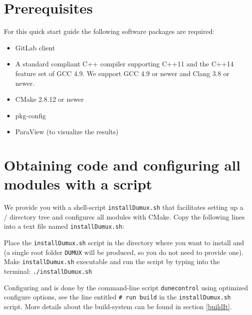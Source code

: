 \section{Prerequisites} \label{sec:prerequisites}
For this quick start guide the following software packages are required:
\begin{itemize}
\item GitLab client
\item A standard compliant C++ compiler supporting C++11 and the C++14 feature set of GCC 4.9. We support GCC 4.9 or newer and Clang 3.8 or newer.
\item CMake 2.8.12 or newer
\item pkg-config
\item ParaView (to visualize the results)
\end{itemize}

\section{Obtaining code and configuring all modules with a script}
We provide you with a shell-script \texttt{installDumux.sh} that facilitates setting up a {\Dune}/{\Dumux} directory tree
and configures all modules with CMake.
Copy the following lines into a text file named \texttt{installDumux.sh}:


Place the \texttt{installDumux.sh} script in the directory where you want to install \Dumux and \Dune (a single
root folder \texttt{DUMUX} will be produced, so you do not need to provide one). Make \texttt{installDumux.sh} executable and run the script by typing into the terminal: \texttt{./installDumux.sh}

Configuring \Dune and \Dumux is done by the command-line script \texttt{dunecontrol}
using optimized configure options, see the line entitled \texttt{\# run build} in the \texttt{installDumux.sh} script.
More details about the build-system can be found in section \ref{buildIt}.


